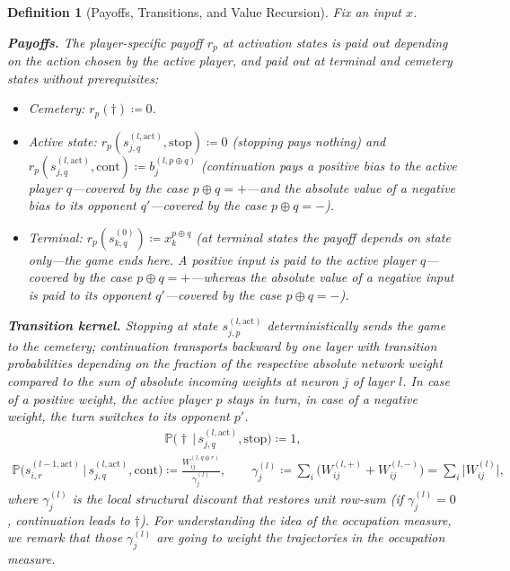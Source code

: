 \documentclass[twoside]{article}
\renewcommand{\P}{\mathbb{P}}
\newcommand{\1}{\mathbf{1}}
\newtheorem{definition}{Definition}
\begin{document}
\begin{definition}[Payoffs, Transitions, and Value Recursion]\label{def:adf-recursion}
Fix an input $x$.

\textbf{Payoffs.} The player-specific \emph{payoff} $r_p$ at activation states is paid out
depending on the action chosen by the active player, and paid out at terminal and cemetery states
without prerequisites:
\begin{itemize}
    \item Cemetery: $r_p(\dagger) \coloneqq 0$.
    \item Active state: $r_p(s_{j,q}^{(l, \mathrm{act})}, \mathrm{stop}) \coloneqq 0$ (stopping pays nothing)
        and $r_p(s_{j,q}^{(l, \mathrm{act})}, \mathrm{cont}) \coloneqq b_j^{(l, p \oplus q)}$ (continuation
        pays a positive bias to the active player $q$---covered by the case $p \oplus q = +$---and the
        absolute value of a negative bias to its opponent $q'$---covered by the case $p \oplus q = -$).
    \item Terminal: $r_p(s_{k,q}^{(0)}) \coloneqq x_k^{p \oplus q}$ (at terminal states the payoff depends on
        state only---the game ends here. A positive input is paid to the active player $q$---covered by the
        case $p \oplus q = +$---whereas the absolute value of a negative input is paid to its opponent
        $q'$---covered by the case $p \oplus q = -$).
\end{itemize}

\textbf{Transition kernel.} Stopping at state $s^{(l, \text{act})}_{j,p}$ deterministically sends
the game to the cemetery; continuation transports backward by one layer with transition
probabilities depending on the fraction of the respective absolute network weight compared to the
sum of absolute incoming weights at neuron $j$ of layer $l$. In case of a positive weight, the
active player $p$ stays in turn, in case of a negative weight, the turn switches to its opponent
$p'$.
\begin{align}\label{eq:adf-kernel-stop}
    \P\bigl(\dagger \,\big|\, s_{j,q}^{(l, \mathrm{act})}, \mathrm{stop}\bigr) \coloneqq 1,
\end{align}
\begin{align}\label{eq:adf-kernel}
    \P\bigl(s_{i,r}^{(l-1, \mathrm{act})} \,\big|\, s_{j,q}^{(l, \mathrm{act})}, \mathrm{cont}\bigr)
    \coloneqq \frac{W_{ij}^{(l, q \oplus r)}}{\gamma_j^{(l)}},
    \qquad
    \gamma_j^{(l)} \coloneqq \sum_i \bigl(W_{ij}^{(l,+)} + W_{ij}^{(l,-)}\bigr) = \sum_i
    \bigl|W_{ij}^{(l)}\bigr|,
\end{align}
where $\gamma_j^{(l)}$ is the local structural discount that restores unit row-sum (if
$\gamma_j^{(l)} = 0$, continuation leads to $\dagger$). For understanding the idea of the
occupation measure, we remark that those $\gamma^{(l)}_j$ are going to weight the trajectories in
the occupation measure.


\end{definition}
\end{document}
